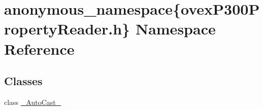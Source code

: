 \hypertarget{namespaceanonymous__namespace_02ovexP300PropertyReader_8h_03}{
\section{anonymous\_\-namespace\{ovexP300PropertyReader.h\} Namespace Reference}
\label{namespaceanonymous__namespace_02ovexP300PropertyReader_8h_03}
}
\subsection*{Classes}
\begin{DoxyCompactItemize}
\item 
class \hyperlink{classanonymous__namespace_02ovexP300PropertyReader_8h_03_1_1__AutoCast__}{\_\-AutoCast\_\-}
\end{DoxyCompactItemize}
